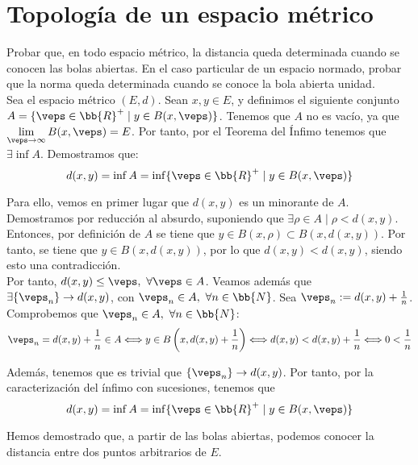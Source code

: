 \section{Topología de un espacio métrico}


\begin{ejercicio}
    Probar que, en todo espacio métrico, la distancia queda determinada cuando se conocen las bolas abiertas. En el caso particular de un espacio normado, probar que la norma queda determinada cuando se conoce la bola abierta unidad.\\

    Sea el espacio métrico $(E,d)$. Sean $x,y\in E$, y definimos el siguiente conjunto $A=\{\veps\in \bb{R}^+\mid y\in B(x,\veps)\}$. Tenemos que $A$ no es vacío, ya que $\lim\limits_{\veps\to \infty}B(x,\veps)=E$. Por tanto, por el Teorema del Ínfimo tenemos que $\exists \inf A$. Demostramos que:
    \begin{equation*}
        d(x,y)=\inf A = \inf \{\veps\in \bb{R}^+\mid y\in B(x,\veps)\}
    \end{equation*}

    Para ello, vemos en primer lugar que $d(x,y)$ es un minorante de $A$. Demostramos por reducción al absurdo, suponiendo que $\exists \rho\in A\mid \rho<d(x,y)$. Entonces, por definición de $A$ se tiene que $y\in B(x,\rho)\subset B(x,d(x,y))$. Por tanto, se tiene que $y\in B(x,d(x,y))$, por lo que $d(x,y)<d(x,y)$, siendo esto una contradicción.\\

    Por tanto, $d(x,y)\leq \veps,~\forall \veps\in A$. Veamos además que $\exists \{\veps_n\}\to d(x,y)$, con $\veps_n\in A,~\forall n\in \bb{N}$. Sea $\veps_n:=d(x,y)+\frac{1}{n}$. Comprobemos que $\veps_n\in A,~\forall n\in \bb{N}$:
    \begin{equation*}
        \veps_n=d(x,y)+\frac{1}{n} \in A \Longleftrightarrow y\in B\left(x,d(x,y)+\frac{1}{n}\right) \Longleftrightarrow d(x,y)<d(x,y)+\frac{1}{n} \Longleftrightarrow 0<\frac{1}{n}
    \end{equation*}

    Además, tenemos que es trivial que $\{\veps_n\}\to d(x,y)$. Por tanto, por la caracterización del ínfimo con sucesiones, tenemos que
    $$d(x,y)=\inf A = \inf \{\veps\in \bb{R}^+\mid y\in B(x,\veps)\}$$

    Hemos demostrado que, a partir de las bolas abiertas, podemos conocer la distancia entre dos puntos arbitrarios de $E$.\\



\end{ejercicio}
